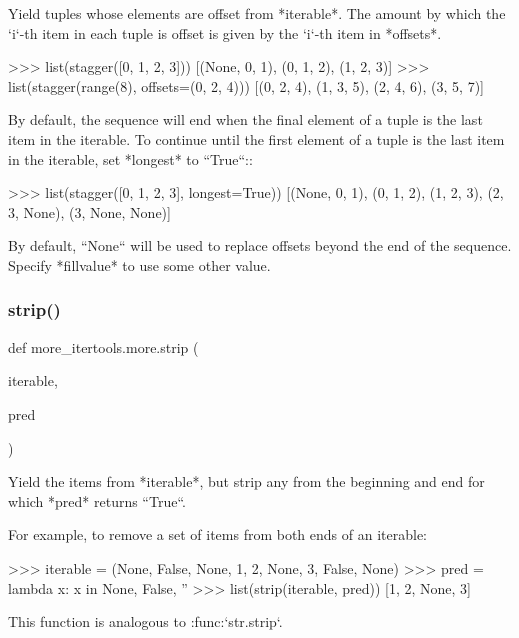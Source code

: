 \begin{DoxyVerb}Yield tuples whose elements are offset from *iterable*.
The amount by which the `i`-th item in each tuple is offset is given by
the `i`-th item in *offsets*.

    >>> list(stagger([0, 1, 2, 3]))
    [(None, 0, 1), (0, 1, 2), (1, 2, 3)]
    >>> list(stagger(range(8), offsets=(0, 2, 4)))
    [(0, 2, 4), (1, 3, 5), (2, 4, 6), (3, 5, 7)]

By default, the sequence will end when the final element of a tuple is the
last item in the iterable. To continue until the first element of a tuple
is the last item in the iterable, set *longest* to ``True``::

    >>> list(stagger([0, 1, 2, 3], longest=True))
    [(None, 0, 1), (0, 1, 2), (1, 2, 3), (2, 3, None), (3, None, None)]

By default, ``None`` will be used to replace offsets beyond the end of the
sequence. Specify *fillvalue* to use some other value.\end{DoxyVerb}
 \mbox{\label{namespacemore__itertools_1_1more_a694868b8622b0a3e098836d687eb091b}} 
\subsubsection{\texorpdfstring{strip()}{strip()}}
{\footnotesize\ttfamily def more\+\_\+itertools.\+more.\+strip (\begin{DoxyParamCaption}\item[{}]{iterable,  }\item[{}]{pred }\end{DoxyParamCaption})}

\begin{DoxyVerb}Yield the items from *iterable*, but strip any from the
beginning and end for which *pred* returns ``True``.

For example, to remove a set of items from both ends of an iterable:

    >>> iterable = (None, False, None, 1, 2, None, 3, False, None)
    >>> pred = lambda x: x in {None, False, ''}
    >>> list(strip(iterable, pred))
    [1, 2, None, 3]

This function is analogous to :func:`str.strip`.\end{DoxyVerb}
 \mbox{\label{namespacemore__itertools_1_1more_af089b69b0ff8567b619e80602740fbda}} 
